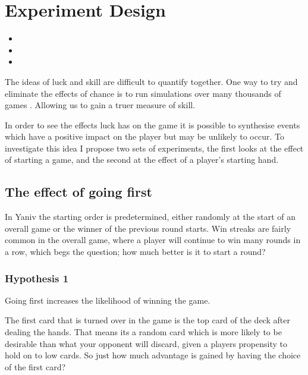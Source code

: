 \documentclass[../main.tex]{subfiles}
\begin{document}
\section{Experiment Design} \label{method:experiments}
\begin{itemize}[nosep]
    \item {}
    \item {}
    \item {}
\end{itemize}


The ideas of luck and skill are difficult to quantify together. One way to try and eliminate the effects of chance is to run simulations over many thousands of games \cite{guo_distinguishing_2019}. Allowing us to gain a truer measure of skill. 

In order to see the effects luck has on the game it is possible to synthesise events which have a positive impact on the player but may be unlikely to occur. To investigate this idea I propose two sets of experiments, the first looks at the effect of starting a game, and the second at the effect of a player's starting hand.

\subsection{The effect of going first} \label{method:going-first}
In Yaniv the starting order is predetermined, either randomly at the start of an overall game or the winner of the previous round starts. Win streaks are fairly common in the overall game, where a player will continue to win many rounds in a row, which begs the question; how much better is it to start a round? 

\subsubsection{Hypothesis 1}
\begin{displayquote}
Going first increases the likelihood of winning the game.
\end{displayquote}

The first card that is turned over in the game is the top card of the deck after dealing the hands. That means its a random card which is more likely to be desirable than what your opponent will discard, given a players propensity to hold on to low cards. So just how much advantage is gained by having the choice of the first card?
\end{document}
